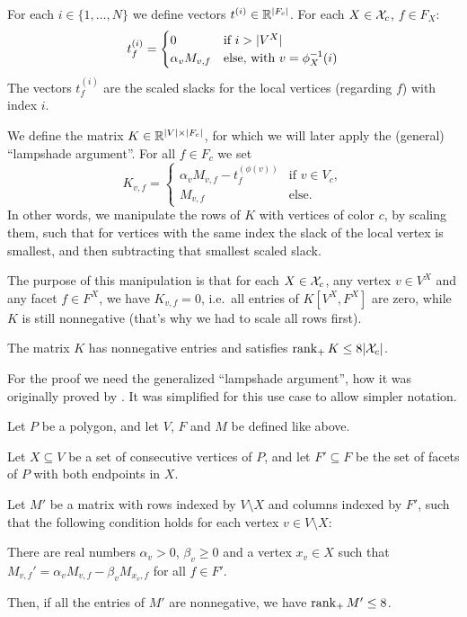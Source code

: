 For each $i \in \{1,\dots,N\}$ we define vectors $t^{(i)} \in \mathbb{R}^{\lvert F_c\rvert}$. For each $X \in \mathcal{X}_c$, $f \in F_X$:
\begin{equation*}
  t_f^{(i)} =
  \begin{cases}
    0                & \text{if } i > \lvert V^X\rvert              \\
    \alpha_v M_{v,f} & \text{else, with } v = \phi_X^{-1}(i)
  \end{cases}
\end{equation*}
The vectors $t_f^{(i)}$ are the scaled slacks for the local vertices (regarding $f$) with index $i$.

We define the matrix $K \in \mathbb{R}^{\lvert V\rvert \times \lvert F_c\rvert}$, for which we will later apply the (general) ``lampshade argument''. For all $f \in F_c$ we set
\begin{equation*}
  K_{v,f} =
  \begin{cases}
    \alpha_v M_{v,f} - t_f^{(\phi(v))} & \text{if } v \in V_c, \\
    M_{v,f}                            & \text{else.}
  \end{cases}
\end{equation*}
In other words, we manipulate the rows of $K$ with vertices of color $c$, by scaling them, such that for vertices with the same index the slack of the local vertex is smallest, and then subtracting that smallest scaled slack.

The purpose of this manipulation is that for each $X \in \mathcal{X}_c$, any vertex $v \in V^X$ and any facet $f \in F^X$, we have $K_{v,f} = 0$, i.e.\ all entries of $K[V^X, F^X]$ are zero, while $K$ is still nonnegative (that's why we had to scale all rows first).

\begin{lemma}\label{lemma:rank-of-K}
  The matrix $K$ has nonnegative entries and satisfies $\operatorname{rank}_+ K \leq 8\lvert\mathcal{X}_c\rvert$.
\end{lemma}

For the proof we need the generalized ``lampshade argument'', how it was originally proved by \textcite[Lemma 3.1]{shitov2014sublinear}. It was simplified for this use case to allow simpler notation.

\begin{lemma}\label{lemma:shitov-lampshade}
  Let $P$ be a polygon, and let $V$, $F$ and $M$ be defined like above.

  Let $X \subseteq V$ be a set of consecutive vertices of $P$, and let $F' \subseteq F$ be the set of facets of $P$ with both endpoints in $X$.

  Let $M'$ be a matrix with rows indexed by $V\setminus X$ and columns indexed by $F'$, such that the following condition holds for each vertex $v\in V\setminus X$:

  There are real numbers $\alpha_v>0$, $\beta_v\geq 0$ and a vertex $x_v\in X$ such that\\
  $M_{v,f}'=\alpha_v M_{v,f}-\beta_v M_{x_v,f}$ for all $f\in F'$.

  Then, if all the entries of $M'$ are nonnegative, we have $\operatorname{rank}_+ M'\le 8$.
\end{lemma}

